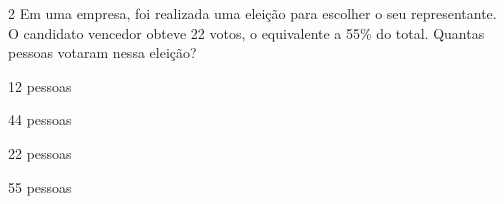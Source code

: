 









\num{2} Em uma empresa, foi realizada uma eleição para escolher o seu
representante. O candidato vencedor obteve 22 votos, o equivalente a
55\% do total. Quantas pessoas votaram nessa eleição?

\begin{escolha}
\item 12 pessoas
\item 44 pessoas
\item 22 pessoas
\item 55 pessoas
\end{escolha}









